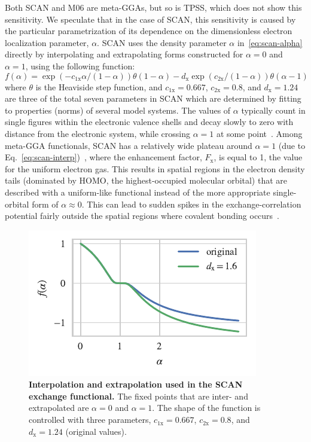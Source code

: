 Both SCAN and M06 are meta-GGAs, but so is TPSS, which does not show this sensitivity.
We speculate that in the case of SCAN, this sensitivity is caused by the particular parametrization of its dependence on the dimensionless electron localization parameter, $\alpha$.
SCAN uses the density parameter $\alpha$ in~\eqref{eq:scan-alpha} directly by interpolating and extrapolating forms constructed for $\alpha=0$ and $\alpha=1$, using the following function:
\begin{equation}
  f(\alpha)=\exp(-c_\mathrm{1x}\alpha/(1-\alpha))\theta(1-\alpha)
  -d_\mathrm x\exp(c_\mathrm{2x}/(1-\alpha))\theta(\alpha-1)
  \label{eq:scan-interp}
\end{equation}
where $\theta$ is the Heaviside step function, and $c_\mathrm{1x}=0.667$, $c_\mathrm{2x}=0.8$, and $d_\mathrm x=1.24$ are three of the total seven parameters in SCAN which are determined by fitting to properties (norms) of several model systems.
The values of $\alpha$ typically count in single figures within the electronic valence shells and decay slowly to zero with distance from the electronic system, while crossing $\alpha=1$ at some point~\cite{SunPRL13,BeckeJCP90}.
Among meta-GGA functionals, SCAN has a relatively wide plateau around $\alpha=1$ (due to Eq.~\ref{eq:scan-interp})~\cite{LoosJCP17}, where the enhancement factor, $F_\mathrm x$, is equal to 1, the value for the uniform electron gas.
This results in spatial regions in the electron density tails (dominated by HOMO, the highest-occupied molecular orbital) that are described with a uniform-like functional instead of the more appropriate single-orbital form of $\alpha\approx0$.
This can lead to sudden spikes in the exchange-correlation potential fairly outside the spatial regions where covalent bonding occurs~\cite{Gerit-private}.

\begin{figure}[t]
\centering
\includegraphics{media/scan-interp}
\caption{\textbf{Interpolation and extrapolation used in the SCAN exchange functional.}
The fixed points that are inter- and extrapolated are $\alpha=0$ and $\alpha=1$.
The shape of the function is controlled with three parameters, $c_\mathrm{1x}=0.667$, $c_\mathrm{2x}=0.8$, and $d_\mathrm x=1.24$ (original values).
}\label{fig:scan-interp}
\end{figure}

